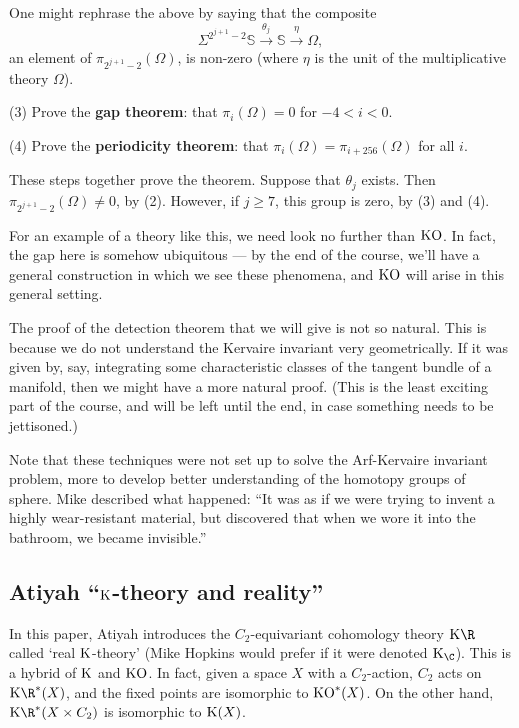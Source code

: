 \documentclass[11pt]{article}
\begin{document}
\begin{FirstNineLectures}
\begin{itemise}
One might rephrase the above by saying that the composite
\[\Sigma^{2^{j+1}-2}\mathbb{S}\overset{\theta_j}{\to}\mathbb{S}\overset{\eta}
{\to}\Omega,\]
an element of $\pi_{2^{j+1}-2}(\Omega)$, is non-zero (where $\eta$ is the unit
of the multiplicative theory $\Omega$).
\item[(3)] Prove the \textbf{gap theorem}: that $\pi_i(\Omega)=0$ for $-4<i<0$.
\item[(4)] Prove the \textbf{periodicity theorem}: that
$\pi_i(\Omega)=\pi_{i+256}(\Omega)$ for all $i$.
\end{itemise}
These steps together prove the theorem. Suppose that $\theta_j$ exists. Then
$\pi_{2^{j+1}-2}(\Omega)\neq0$, by (2). However, if $j\geq7$, this group is
zero, by (3) and (4).

For an example of a theory like this, we need look no further than $\operatorname{{KO}}$. In
fact, the gap here is somehow ubiquitous --- by the end of the course, we'll
have a general construction in which we see these phenomena, and $\operatorname{{KO}}$ will
arise in this general setting.

The proof of the detection theorem that we will give is not so natural. This is
because we do not understand the Kervaire invariant very geometrically. If it
was given by, say, integrating some characteristic classes of the tangent bundle
of a manifold, then we might have a more natural proof. {\small(This is the
least exciting part of the course, and will be left until the end, in case
something needs to be jettisoned.)}

Note that these techniques were not set up to solve the Arf-Kervaire invariant
problem, more to develop better understanding of the homotopy groups of sphere.
Mike described what happened: ``It was as if we were trying to invent a highly
wear-resistant material, but discovered that when we wore it into the bathroom,
we became invisible.''

\subsection*{Atiyah ``\texorpdfstring{$\operatorname{{K}}$}{K}-theory and reality''}
In this paper, Atiyah introduces the $C_2$-equivariant cohomology theory $\KR$
called `real $\operatorname{{K}}$-theory' (Mike Hopkins would prefer if it were denoted
${\K_\C}$). This is a hybrid of $\operatorname{{K}}$ and $\operatorname{{KO}}$. In fact, given a space $X$ with
a $C_2$-action, $C_2$ acts on $\KR^*(X)$, and the fixed points are isomorphic to
$\operatorname{{KO}}^*(X)$. On the other hand, $\KR^*(X\times C_2)$ is isomorphic to $\operatorname{{K}}(X)$.


\end{FirstNineLectures}
\end{document}
